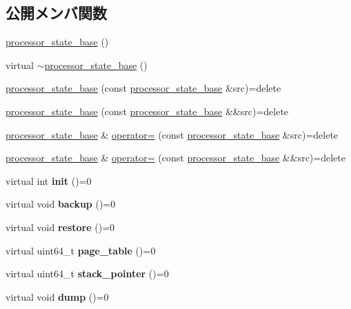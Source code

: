 \subsection*{公開メンバ関数}
\begin{DoxyCompactItemize}
\item 
\hyperlink{classprocessor__state__base_afa639f99ceb2319a229882562145499e}{processor\+\_\+state\+\_\+base} ()
\item 
virtual \hyperlink{classprocessor__state__base_a79d61521ea6b3066bf03d3c7e2d1d977}{$\sim$processor\+\_\+state\+\_\+base} ()
\item 
\hyperlink{classprocessor__state__base_a8a5444f4f1343d5a0ec699b08003f793}{processor\+\_\+state\+\_\+base} (const \hyperlink{classprocessor__state__base}{processor\+\_\+state\+\_\+base} \&src)=delete
\item 
\hyperlink{classprocessor__state__base_a279491bbdf2128e13415e12b998fdc2e}{processor\+\_\+state\+\_\+base} (const \hyperlink{classprocessor__state__base}{processor\+\_\+state\+\_\+base} \&\&src)=delete
\item 
\hyperlink{classprocessor__state__base}{processor\+\_\+state\+\_\+base} \& \hyperlink{classprocessor__state__base_a93975feff3d07c035f39cf756c59c5c9}{operator=} (const \hyperlink{classprocessor__state__base}{processor\+\_\+state\+\_\+base} \&src)=delete
\item 
\hyperlink{classprocessor__state__base}{processor\+\_\+state\+\_\+base} \& \hyperlink{classprocessor__state__base_a99397522239060856bcca363c221e279}{operator=} (const \hyperlink{classprocessor__state__base}{processor\+\_\+state\+\_\+base} \&\&src)=delete
\item 
\hypertarget{classprocessor__state__base_a30d2bc178c4a436997713e97c7a722e6}{}\label{classprocessor__state__base_a30d2bc178c4a436997713e97c7a722e6} 
virtual int {\bfseries init} ()=0
\item 
\hypertarget{classprocessor__state__base_a1b3fb544ee8eead6f1c74e31d74ab8d5}{}\label{classprocessor__state__base_a1b3fb544ee8eead6f1c74e31d74ab8d5} 
virtual void {\bfseries backup} ()=0
\item 
\hypertarget{classprocessor__state__base_a4d5c92c17471b9d84e0d520b89c3bfb8}{}\label{classprocessor__state__base_a4d5c92c17471b9d84e0d520b89c3bfb8} 
virtual void {\bfseries restore} ()=0
\item 
\hypertarget{classprocessor__state__base_a436b776e0fe773cc856a71a669514ff9}{}\label{classprocessor__state__base_a436b776e0fe773cc856a71a669514ff9} 
virtual uint64\+\_\+t {\bfseries page\+\_\+table} ()=0
\item 
\hypertarget{classprocessor__state__base_ab617887e3d076158d3e54b7ff0f3a586}{}\label{classprocessor__state__base_ab617887e3d076158d3e54b7ff0f3a586} 
virtual uint64\+\_\+t {\bfseries stack\+\_\+pointer} ()=0
\item 
\hypertarget{classprocessor__state__base_af083c79264a522f72719a43987ed321d}{}\label{classprocessor__state__base_af083c79264a522f72719a43987ed321d} 
virtual void {\bfseries dump} ()=0
\end{DoxyCompactItemize}


